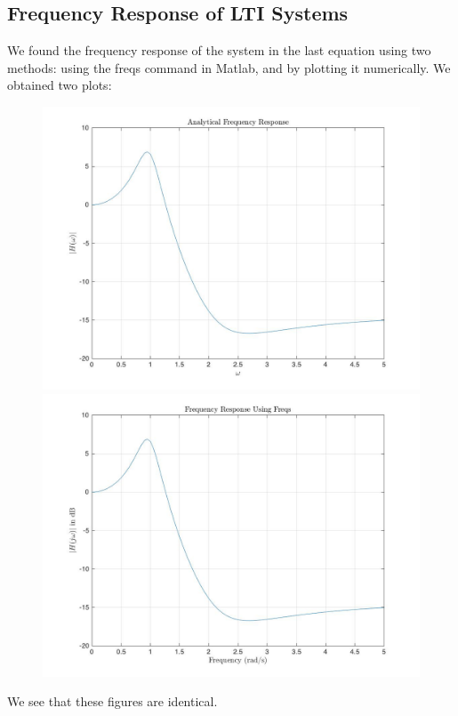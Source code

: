 \documentclass{article}
\begin{document}
\subsection{Frequency Response of LTI Systems}
We found the frequency response of the system in the last equation using two methods: using the freqs command in Matlab, and by plotting it numerically. We obtained two plots:
\begin{figure}[!htbp]
\begin{minipage}{\linewidth}
\includegraphics[width = 1\linewidth, height = 0.4\textheight]{analytical_freq.jpg}
\end{minipage}
\begin{minipage}{\linewidth}
\includegraphics[width = 1\linewidth, height = 0.4\textheight]{num_freq.jpg}
\end{minipage}
\end{figure}
We see that these figures are identical.
\FloatBarrier
\end{document}
